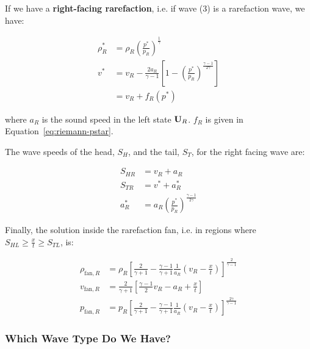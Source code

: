 If we have a \textbf{right-facing rarefaction}, i.e. if wave (3) is a
rarefaction wave, we have:

\begin{align*}
\rho^*_R &=
	\rho_R \left( \frac{p^*}{p_R} \right) ^ \frac{1}{\gamma}\\
v^* &=
	v_R - \frac{2 a_R}{\gamma - 1}
	\left[
		1 - \left( \frac{p^*}{p_R} \right) ^ \frac{\gamma - 1}{2 \gamma}
	\right]\\
	&= v_R + f_R(p^*)
\end{align*}

where $a_R$ is the sound speed in the left state $\mathbf{U}_R$.
$f_R$ is given in Equation~\ref{eq:riemann-pstar}.





The wave speeds of the head, $S_H$, and the tail, $S_T$, for the right facing
wave are:

\begin{align*}
	S_{HR} &= v_R + a_R\\
	S_{TR} &= v^* + a^*_R\\
	a^*_R  &= a_R \left( \frac{p^*}{p_R} \right) ^ \frac{\gamma - 1}{2 \gamma}
\end{align*}




Finally, the solution inside the rarefaction fan, i.e. in regions where $S_{HL}
\geq \frac{x}{t} \geq S_{TL}$, is:

\begin{align}
\rho_{\text{fan}, R} &=
	\rho_R \left[
		\frac{2}{\gamma + 1} -
		\frac{\gamma - 1}{\gamma + 1}
		\frac{1}{a_R}
		\left(v_R - \frac{x}{t}\right)
	\right] ^ \frac{2}{\gamma -1 }
	\label{eq:rho-rarefaction-fan-right}\\
v_{\text{fan}, R} &=
	\frac{2}{\gamma + 1}
	\left[
		\frac{\gamma - 1}{2} v_R - a_R + \frac{x}{t}
	\right] \\
p_{\text{fan}, R} &=
	p_R
	\left[
		\frac{2}{\gamma + 1} -
		\frac{\gamma - 1}{\gamma + 1}
		\frac{1}{a_R}
		\left(v_R - \frac{x}{t}\right)
	\right] ^ \frac{2 \gamma}{\gamma -1}
	\label{eq:pressure-rarefaction-fan-right}
\end{align}












\subsubsection{Which Wave Type Do We Have?}


